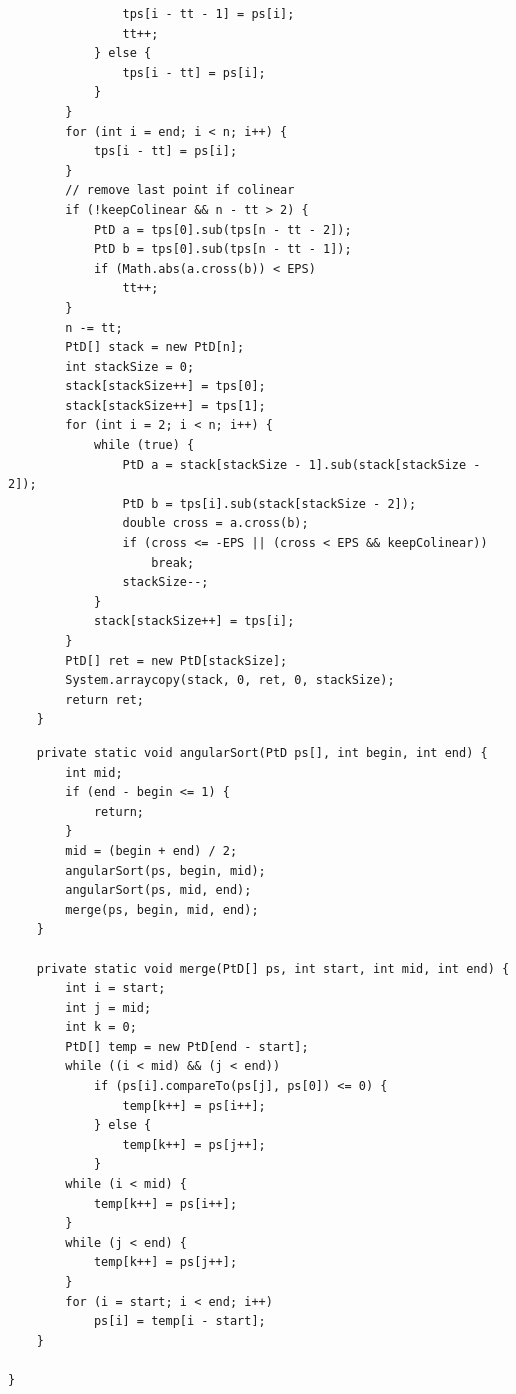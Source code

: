 \documentclass{article}
\begin{document}
\begin{verbatim}
                tps[i - tt - 1] = ps[i];
                tt++;
            } else {
                tps[i - tt] = ps[i];
            }
        }
        for (int i = end; i < n; i++) {
            tps[i - tt] = ps[i];
        }
        // remove last point if colinear
        if (!keepColinear && n - tt > 2) {
            PtD a = tps[0].sub(tps[n - tt - 2]);
            PtD b = tps[0].sub(tps[n - tt - 1]);
            if (Math.abs(a.cross(b)) < EPS)
                tt++;
        }
        n -= tt;
        PtD[] stack = new PtD[n];
        int stackSize = 0;
        stack[stackSize++] = tps[0];
        stack[stackSize++] = tps[1];
        for (int i = 2; i < n; i++) {
            while (true) {
                PtD a = stack[stackSize - 1].sub(stack[stackSize - 2]);
                PtD b = tps[i].sub(stack[stackSize - 2]);
                double cross = a.cross(b);
                if (cross <= -EPS || (cross < EPS && keepColinear))
                    break;
                stackSize--;
            }
            stack[stackSize++] = tps[i];
        }
        PtD[] ret = new PtD[stackSize];
        System.arraycopy(stack, 0, ret, 0, stackSize);
        return ret;
    }

    \end{verbatim}
    \begin{verbatim}
    private static void angularSort(PtD ps[], int begin, int end) {
        int mid;
        if (end - begin <= 1) {
            return;
        }
        mid = (begin + end) / 2;
        angularSort(ps, begin, mid);
        angularSort(ps, mid, end);
        merge(ps, begin, mid, end);
    }

    private static void merge(PtD[] ps, int start, int mid, int end) {
        int i = start;
        int j = mid;
        int k = 0;
        PtD[] temp = new PtD[end - start];
        while ((i < mid) && (j < end))
            if (ps[i].compareTo(ps[j], ps[0]) <= 0) {
                temp[k++] = ps[i++];
            } else {
                temp[k++] = ps[j++];
            }
        while (i < mid) {
            temp[k++] = ps[i++];
        }
        while (j < end) {
            temp[k++] = ps[j++];
        }
        for (i = start; i < end; i++)
            ps[i] = temp[i - start];
    }

}

    \end{verbatim}
\end{document}
